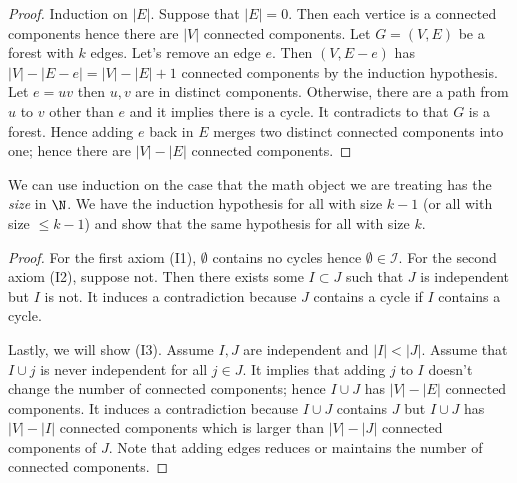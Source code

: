 


\begin{proof}
    Induction on $|E|$. Suppose that $|E| = 0$. Then each vertice is a connected components hence there are $|V|$ connected components. Let $G = (V, E)$ be a forest with $k$ edges. Let's remove an edge $e$. Then $(V, E-e)$ has $|V|-|E-e| = |V|-|E|+1$ connected components by the induction hypothesis. Let $e = uv$ then $u, v$ are in distinct components. Otherwise, there are a path from $u$ to $v$ other than $e$ and it implies there is a cycle. It contradicts to that $G$ is a forest. Hence adding $e$ back in $E$ merges two distinct connected components into one; hence there are $|V|-|E|$ connected components.
\end{proof}
\noindent

We can use induction on the case that the math object we are treating has the \textit{size} in $\N$. We have the induction hypothesis for all with size $k-1$ (or all with size $\leq k-1$) and show that the same hypothesis for all with size $k$.

\begin{proof}
    For the first axiom (I1), $\emptyset$ contains no cycles hence $\emptyset \in \mathcal{I}$. For the second axiom (I2), suppose not. Then there exists some $I \subset J$ such that $J$ is independent but $I$ is not. It induces a contradiction because $J$ contains a cycle if $I$ contains a cycle.

    Lastly, we will show (I3). Assume $I, J$ are independent and $|I|<|J|$. Assume that $I \cup j$ is never independent for all $j \in J$. It implies that adding $j$ to $I$ doesn't change the number of connected components; hence $I \cup J$ has $|V|-|E|$ connected components. It induces a contradiction because $I \cup J$ contains $J$ but $I \cup J$ has $|V|-|I|$ connected components which is larger than $|V|-|J|$ connected components of $J$. Note that adding edges reduces or maintains the number of connected components.
\end{proof}


